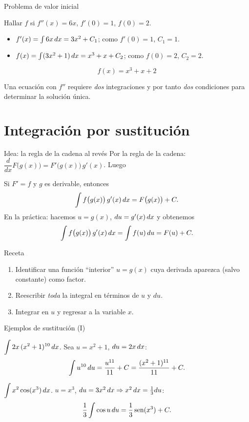 \documentclass[10pt,aspectratio=169]{beamer}
\begin{document}
\begin{frame}{Problema de valor inicial}
  \begin{ejemplo}[4]
    Hallar $f$ si $f''(x)=6x$, $f'(0)=1$, $f(0)=2$.\\
    \begin{itemize}
      \item $f'(x)=\int 6x\,dx=3x^2+C_1$; como $f'(0)=1$, $C_1=1$.
      \item $f(x)=\int(3x^2+1)\,dx=x^3+x+C_2$; como $f(0)=2$, $C_2=2$.
    \end{itemize}
    \[ \boxed{f(x)=x^3+x+2} \]
  \end{ejemplo}
  \begin{observacion}
    Una ecuación con $f''$ requiere \emph{dos} integraciones y por tanto \emph{dos} condiciones
    para determinar la solución única.
  \end{observacion}
\end{frame}

\section{Integración por sustitución}

\begin{frame}{Idea: la regla de la cadena al revés}
  Por la regla de la cadena: $\dfrac{d}{dx}F\big(g(x)\big)=F'\big(g(x)\big)\,g'(x)$. Luego
  \begin{teorema}[Sustitución]
    \small
    Si $F'=f$ y $g$ es derivable, entonces
    \[ \int f\big(g(x)\big)\,g'(x)\,dx = F\big(g(x)\big)+C. \]
    En la práctica: hacemos $u=g(x)$, $du=g'(x)\,dx$ y obtenemos
    \[ \int f\big(g(x)\big)\,g'(x)\,dx=\int f(u)\,du = F(u)+C. \]
  \end{teorema}
  \begin{block}{Receta}
    \small
    \begin{enumerate}
      \item Identificar una función ``interior'' $u=g(x)$ cuya derivada aparezca (salvo constante) como factor.
      \item Reescribir \emph{toda} la integral en términos de $u$ y $du$.
      \item Integrar en $u$ y regresar a la variable $x$.
    \end{enumerate}
  \end{block}
\end{frame}

\begin{frame}{Ejemplos de sustitución (I)}
  \begin{ejemplo}[1]
    $\displaystyle\int 2x\,(x^2+1)^{10}\,dx$. \quad Sea $u=x^2+1$, $du=2x\,dx$:
    \[ \int u^{10}\,du=\frac{u^{11}}{11}+C=\frac{(x^2+1)^{11}}{11}+C. \]
  \end{ejemplo}
  \begin{ejemplo}
    $\displaystyle\int x^2\cos(x^3)\,dx$. \quad $u=x^3$, $du=3x^2\,dx\Rightarrow x^2\,dx=\tfrac13du$:
    \[ \frac13\int\cos u\,du=\frac13\operatorname{sen}(x^3)+C. \]
  \end{ejemplo}
\end{frame}
\end{document}

